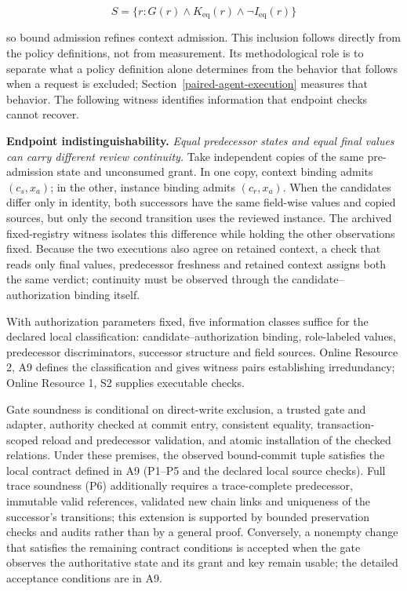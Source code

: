 \documentclass[pdflatex,sn-basic]{sn-jnl}
\begin{document}
\[
S = \{r : G(r) \land  K_{\mathrm{eq}}(r) \land  \neg I_{\mathrm{eq}}(r)\}
\]

so bound admission refines context admission. This inclusion follows directly from the policy definitions, not from measurement. Its methodological role is to separate what a policy definition alone determines from the behavior that follows when a request is excluded; Section~\ref{paired-agent-execution} measures that behavior. The following witness identifies information that endpoint checks cannot recover.

\textbf{Endpoint indistinguishability.} \emph{Equal predecessor states and equal final values can carry different review continuity.} Take independent copies of the same pre-admission state and unconsumed grant. In one copy, context binding admits \((c_s,x_a)\); in the other, instance binding admits \((c_r,x_a)\). When the candidates differ only in identity, both successors have the same field-wise values and copied sources, but only the second transition uses the reviewed instance. The archived fixed-registry witness isolates this difference while holding the other observations fixed. Because the two executions also agree on retained context, a check that reads only final values, predecessor freshness and retained context assigns both the same verdict; continuity must be observed through the candidate--authorization binding itself.

With authorization parameters fixed, five information classes suffice for the declared local classification: candidate--authorization binding, role-labeled values, predecessor discriminators, successor structure and field sources. Online Resource 2, A9 defines the classification and gives witness pairs establishing irredundancy; Online Resource 1, S2 supplies executable checks.

Gate soundness is conditional on direct-write exclusion, a trusted gate and adapter, authority checked at commit entry, consistent equality, transaction-scoped reload and predecessor validation, and atomic installation of the checked relations. Under these premises, the observed bound-commit tuple satisfies the local contract defined in A9 (P1--P5 and the declared local source checks). Full trace soundness (P6) additionally requires a trace-complete predecessor, immutable valid references, validated new chain links and uniqueness of the successor's transitions; this extension is supported by bounded preservation checks and audits rather than by a general proof. Conversely, a nonempty change that satisfies the remaining contract conditions is accepted when the gate observes the authoritative state and its grant and key remain usable; the detailed acceptance conditions are in A9.
\end{document}
